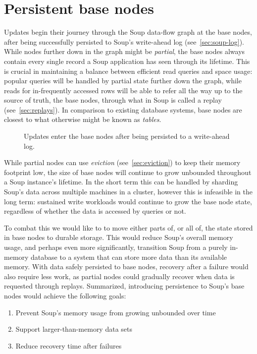 \chapter{Persistent base nodes}\label{chap:persistent-bases}

Updates begin their journey through the Soup data-flow graph at the base nodes,
after being successfully persisted to Soup's write-ahead log
(see~\ref{sec:soup-log}). While nodes further down in the graph might be
\textit{partial}, the base nodes always contain every single record a Soup
application has seen through its lifetime. This is crucial in maintaining a
balance between efficient read queries and space usage: popular queries will be
handled by partial state further down the graph, while reads for in-frequently
accessed rows will be able to refer all the way up to the source of truth, the
base nodes, through what in Soup is called a replay (see~\ref{sec:replays}). In
comparison to existing database systems, base nodes are closest to what
otherwise might be known as \textit{tables}.

\begin{figure}[H]
  \centering
  
  \caption{Updates enter the base nodes after being persisted to a write-ahead
  log.}
\end{figure}

While partial nodes can use \textit{eviction} (see~\ref{sec:eviction}) to keep
their memory footprint low, the size of base nodes will continue to grow
unbounded throughout a Soup instance's lifetime. In the short term this can be
handled by sharding Soup's data across multiple machines in a cluster, however
this is infeasible in the long term: sustained write workloads would continue to
grow the base node state, regardless of whether the data is accessed by queries
or not.

To combat this we would like to to move either parts of, or all of, the state
stored in base nodes to durable storage. This would reduce Soup's overall memory
usage, and perhaps even more significantly, transition Soup from a purely
in-memory database to a system that can store more data than its available
memory. With data safely persisted to base nodes, recovery after a failure would
also require less work, as partial nodes could gradually recover when data is
requested through replays. Summarized, introducing persistence to Soup's base
nodes would achieve the following goals:

\begin{enumerate}
  \item Prevent Soup's memory usage from growing unbounded over time
  \item Support larger-than-memory data sets
  \item Reduce recovery time after failures
\end{enumerate}

